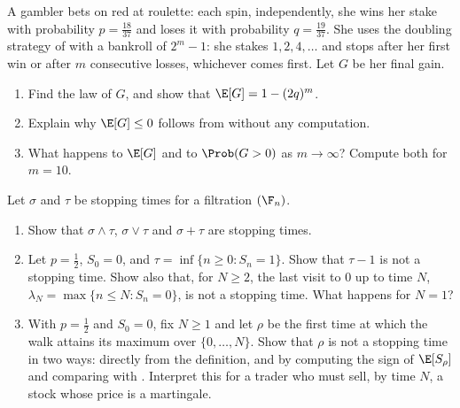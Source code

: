 \begin{exercise}\label{ex:mg-roulette}
\easy A gambler bets on red at roulette: each spin, independently, she wins her stake with
probability $p=\frac{18}{37}$ and loses it with probability $q=\frac{19}{37}$. She uses the
doubling strategy of  with a bankroll of $2^m-1$: she stakes
$1,2,4,\dots$ and stops after her first win or after $m$ consecutive losses, whichever comes
first. Let $G$ be her final gain.
\begin{enumerate}[label=(\alph*)]
  \item Find the law of $G$, and show that $\E[G]=1-(2q)^m$.
  \item Explain why $\E[G]\le0$ follows from  without any
    computation.
  \item What happens to $\E[G]$ and to $\Prob(G>0)$ as $m\to\infty$? Compute both for $m=10$.
\end{enumerate}
\end{exercise}

\begin{exercise}[No clairvoyance]\label{ex:mg-stopping}
\easy Let $\sigma$ and $\tau$ be stopping times for a filtration $(\F_n)$.
\begin{enumerate}[label=(\alph*)]
  \item Show that $\sigma\wedge\tau$, $\sigma\vee\tau$ and $\sigma+\tau$ are stopping times.
  \item Let $p=\frac12$, $S_0=0$, and $\tau=\inf\{n\ge0:S_n=1\}$. Show that $\tau-1$ is not a
    stopping time. Show also that, for $N\ge2$, the last visit to $0$ up to time $N$,
    $\lambda_N=\max\{n\le N:S_n=0\}$, is not a stopping time. What happens for $N=1$?
  \item With $p=\frac12$ and $S_0=0$, fix $N\ge1$ and let $\rho$ be the first time at which the
    walk attains its maximum over $\{0,\dots,N\}$. Show that $\rho$ is not a stopping time in
    two ways: directly from the definition, and by computing the sign of $\E[S_\rho]$ and
    comparing with . Interpret this for a trader who must
    sell, by time $N$, a stock whose price is a martingale.
\end{enumerate}
\end{exercise}

